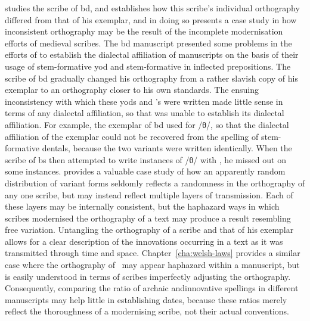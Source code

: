 \Textcite{Rus_Whatdid99} studies the scribe of \gls{bd}, and establishes how this scribe's individual orthography differed from that of his exemplar, and in doing so presents a case study in how inconsistent orthography may be the result of the incomplete modernisation efforts of medieval scribes. 
The \gls{bd} manuscript presented some problems in the efforts of \textcite{Tho_Middle93} to establish the dialectal affiliation of manuscripts on the basis of their usage of stem-formative yod and stem-formative  in  inflected prepositions. The scribe of \gls{bd} gradually changed his orthography from a rather slavish copy of his exemplar to an orthography closer to his own standards. The ensuing inconsistency with which these yods and 's were written made little sense in terms of any dialectal affiliation, so that \textcite{Tho_Middle93} was unable to establish its dialectal affiliation. For example, the exemplar of \gls{bd} used  for /θ/, so that the dialectal affiliation of the exemplar could not be recovered from the spelling of stem-formative dentals, because the two variants were written identically. When the scribe of \gls{bs} then attempted to write instances of /θ/ with , he missed out on some instances. \Textcite{Rus_Whatdid99} provides a valuable case study of how an apparently random distribution of variant forms seldomly reflects a randomness in the orthography of any one scribe, but may instead reflect multiple layers of transmission. Each of these layers may be internally consistent, but the haphazard ways in which scribes modernised the orthography of a text may produce a result resembling free variation. Untangling the orthography of a scribe and that of his exemplar allows for a clear description of the innovations occurring in a text as it was transmitted through time and space. Chapter~\ref{cha:welsh-laws} provides a similar case where the orthography of \lT\ may appear haphazard within a manuscript, but is easily understood in terms of scribes imperfectly adjusting the orthography. Consequently, comparing the ratio of archaic andinnovative spellings in different manuscripts may help little in establishing dates, because these ratios merely reflect the thoroughness of a modernising scribe, not their actual conventions.

